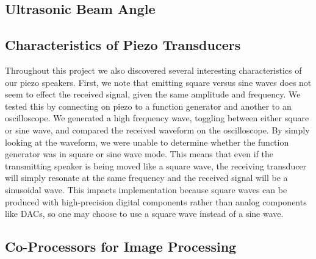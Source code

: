 \documentclass{article}
\begin{document}

  \subsection{Ultrasonic Beam Angle}


  \subsection{Characteristics of Piezo Transducers}

    Throughout this project we also discovered several interesting characteristics of our piezo speakers. First, we note that emitting square versus sine waves does not seem to effect the received signal, given the same amplitude and frequency. We tested this by connecting on piezo to a function generator and another to an oscilloscope. We generated a high frequency wave, toggling between either square or sine wave, and compared the received waveform on the oscilloscope. By simply looking at the waveform, we were unable to determine whether the function generator was in square or sine wave mode. This means that even if the transmitting speaker is being moved like a square wave, the receiving transducer will simply resonate at the same frequency and the received signal will be a sinusoidal wave. This impacts implementation because square waves can be produced with high-precision digital components rather than analog components like DACs, so one may choose to use a square wave instead of a sine wave.

	\subsection{Co-Processors for Image Processing}
\end{document}
